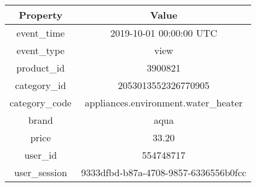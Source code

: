 \begin{center}
    \begin{tabular}{ | c| c | } 
     \hline
     \textbf{Property} & \textbf{Value}  \\  
     \hline
     event\_time & 2019-10-01 00:00:00 UTC \\
     \hline
     event\_type & view \\
     \hline
     product\_id & 3900821 \\
     \hline
     category\_id & 2053013552326770905 \\
     \hline
     category\_code & appliances.environment.water\_heater \\
     \hline
     brand & aqua \\
     \hline
     price & 33.20 \\
     \hline
     user\_id & 554748717 \\
     \hline
     user\_session & 9333dfbd-b87a-4708-9857-6336556b0fcc \\
     \hline
    \end{tabular}
\end{center}


